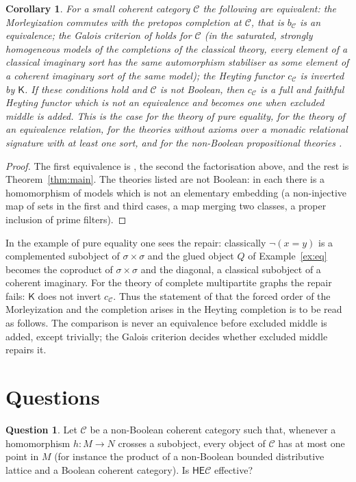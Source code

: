 \documentclass[11pt]{amsart}
\newtheorem{cor}[thm]{Corollary}
\theoremstyle{definition}
\newtheorem{que}[thm]{Question}
\newcommand{\EE}{\mathsf E}
\newcommand{\HH}{\mathsf H}
\newcommand{\KK}{\mathsf K}
\newcommand{\cC}{\mathcal C}
\begin{document}
\begin{cor}\label{cor:K}
For a small coherent category $\cC$ the following are equivalent: the
Morleyization commutes with the pretopos completion at $\cC$, that is
$b_\cC$ is an equivalence; the Galois criterion of
\cite[Thm.~6.1]{Morley} holds for $\cC$ (in the saturated, strongly
homogeneous models of the completions of the classical theory, every
element of a classical imaginary sort has the same automorphism
stabiliser as some element of a coherent imaginary sort of the same
model); the Heyting functor $c_\cC$ is
inverted by $\KK$. If these conditions hold and $\cC$ is not Boolean, then $c_\cC$ is a
full and faithful Heyting functor which is not an equivalence and
becomes one when excluded middle is added. This is the case for the
theory of pure equality, for the theory of an equivalence relation,
for the theories without axioms over a monadic relational signature
with at least one sort, and for the non-Boolean propositional theories
\cite[Ex.~6.5, Thm.~8.2, Thm.~7.1, Prop.~5.2]{Morley}.
\end{cor}
\begin{proof}
The first equivalence is \cite[Thm.~6.1]{Morley}, the second the
factorisation above, and the rest is Theorem~\ref{thm:main}. The
theories listed are not Boolean: in each there is a homomorphism of
models which is not an elementary embedding (a non-injective map of
sets in the first and third cases, a map merging two classes, a proper
inclusion of prime filters).
\end{proof}

In the example of pure equality one sees the repair: classically
$\neg(x=y)$ is a complemented subobject of $\sigma\times\sigma$ and the
glued object $Q$ of Example~\ref{ex:eq} becomes the coproduct of
$\sigma\times\sigma$ and the diagonal, a classical subobject of a
coherent imaginary. For the theory of complete multipartite graphs
\cite[Thm.~5.3]{Morley} the repair fails: $\KK$ does not invert
$c_\cC$. Thus the statement of \cite{Morley} that the forced order of
the Morleyization and the completion arises in the Heyting completion
is to be read as follows. The comparison is never an equivalence
before excluded middle is added, except trivially; the Galois criterion
decides whether excluded middle repairs it.

\section{Questions}

\begin{que}\label{que:E}
Let $\cC$ be a non-Boolean coherent category such that, whenever a
homomorphism $h\colon M\to N$ crosses a subobject, every object of
$\cC$ has at most one point in $M$ (for instance the product of a
non-Boolean bounded distributive lattice and a Boolean coherent
category). Is
$\HH\EE\cC$ effective?
\end{que}
\end{document}
